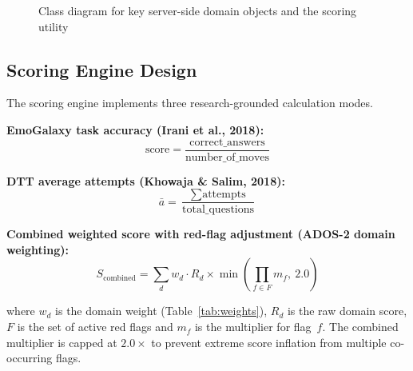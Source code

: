 \documentclass[12pt,a4paper,oneside]{report}
\begin{document}
\begin{figure}[b]
{}
		\caption{Class diagram for key server-side domain objects and the scoring utility}
		\label{fig:classdiag}
	\end{figure}
	
	\clearpage
	\subsection{Scoring Engine Design}
	
	The scoring engine implements three research-grounded calculation modes.
	
	\textbf{EmoGalaxy task accuracy (Irani et al., 2018):}
	\begin{equation}
		\text{score} = \frac{\text{correct\_answers}}{\text{number\_of\_moves}}
	\end{equation}
	
	\textbf{DTT average attempts (Khowaja \& Salim, 2018):}
	\begin{equation}
		\bar{a} = \frac{\sum \text{attempts}}{\text{total\_questions}}
	\end{equation}
	
	\textbf{Combined weighted score with red-flag adjustment (ADOS-2 domain weighting):}
	\begin{equation}
		S_{\text{combined}} = \sum_{d} w_d \cdot R_d \times \min\!\left(\prod_{f \in F} m_f,\ 2.0\right)
	\end{equation}
	
	where $w_d$ is the domain weight (Table~\ref{tab:weights}), $R_d$ is the raw domain score, $F$ is the set of active red flags and $m_f$ is the multiplier for flag~$f$. The combined multiplier is capped at $2.0\times$ to prevent extreme score inflation from multiple co-occurring flags.
	
\end{document}
